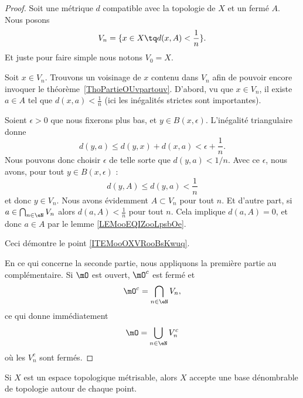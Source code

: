 \begin{proof}
	Soit une métrique \( d\) compatible avec la topologie de \( X\) et un fermé \( A\). Nous posons
	\begin{equation}
		V_n=\{ x\in X\tq d(x,A)<\frac{1}{ n } \}.
	\end{equation}
	Et juste pour faire simple nous notons \( V_0=X\).
	\begin{subproof}
		Soit \( x\in V_n\). Trouvons un voisinage de \( x\) contenu dans \( V_n\) afin de pouvoir encore invoquer le théorème~\ref{ThoPartieOUvpartouv}. D'abord, vu que \( x\in V_n\), il existe \( a\in A\) tel que \( d(x,a)<\frac{ 1 }{ n }\) (ici les inégalités strictes sont importantes).

		Soient \( \epsilon>0\) que nous fixerons plus bas, et \( y\in B(x,\epsilon)\). L'inégalité triangulaire donne
		\begin{equation}
			d(y,a)\leq d(y,x)+d(x,a)<\epsilon+\frac{1}{ n }.
		\end{equation}
		Nous pouvons donc choisir \( \epsilon\) de telle sorte que \( d(y,a)<1/n\). Avec ce \( \epsilon\), nous avons, pour tout \( y\in B(x,\epsilon)\) :
		\begin{equation}
			d(y,A)\leq d(y,a)<\frac{1}{ n }
		\end{equation}
		et donc \( y\in V_n\).
		Nous avons évidemment \( A\subset V_n\) pour tout \( n\). Et d'autre part, si \( a\in\bigcap_{n\in \eN} V_n\) alors \( d(a,A)<\frac{1}{ n }\) pour tout \( n\). Cela implique \( d(a,A)=0\), et donc \( a\in A\) par le lemme \ref{LEMooEQIZooLpsbOe}.
	\end{subproof}

	Ceci démontre le point \ref{ITEMooOXVRooBsKwuq}.

	En ce qui concerne la seconde partie, nous appliquons la première partie au complémentaire. Si \( \mO\) est ouvert, \( \mO^c\) est fermé et
	\begin{equation}
		\mO^c=\bigcap_{n\in \eN}V_n,
	\end{equation}
	ce qui donne immédiatement
	\begin{equation}
		\mO=\bigcup_{n\in \eN}V_n^c
	\end{equation}
	où les \( V_n^c\) sont fermés.
\end{proof}

\begin{corollary}       \label{CORooTWFYooCNMieM}
	Si \( X\) est un espace topologique métrisable, alors \( X\) accepte une base dénombrable de topologie autour de chaque point.
\end{corollary}

